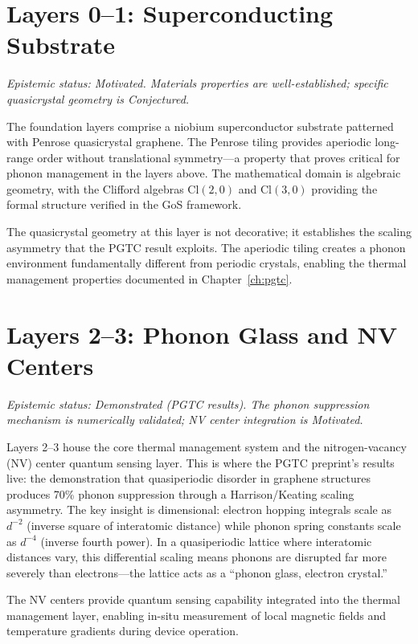 \documentclass[12pt,letterpaper]{report}
\newcommand{\epistemic}[1]{%
  \par\vspace{4pt}%
  {\small\itshape\color{gray} Epistemic status: #1}%
  \par\vspace{4pt}%
}
\begin{document}
\section{Layers 0--1: Superconducting Substrate}

\epistemic{Motivated. Materials properties are well-established; specific quasicrystal geometry is Conjectured.}

The foundation layers comprise a niobium superconductor substrate patterned with Penrose quasicrystal graphene. The Penrose tiling provides aperiodic long-range order without translational symmetry---a property that proves critical for phonon management in the layers above. The mathematical domain is algebraic geometry, with the Clifford algebras $\mathrm{Cl}(2,0)$ and $\mathrm{Cl}(3,0)$ providing the formal structure verified in the GoS framework.

The quasicrystal geometry at this layer is not decorative; it establishes the scaling asymmetry that the PGTC result exploits. The aperiodic tiling creates a phonon environment fundamentally different from periodic crystals, enabling the thermal management properties documented in Chapter~\ref{ch:pgtc}.

\section{Layers 2--3: Phonon Glass and NV Centers}

\epistemic{Demonstrated (PGTC results). The phonon suppression mechanism is numerically validated; NV center integration is Motivated.}

Layers 2--3 house the core thermal management system and the nitrogen-vacancy (NV) center quantum sensing layer. This is where the PGTC preprint's results live: the demonstration that quasiperiodic disorder in graphene structures produces 70\% phonon suppression through a Harrison/Keating scaling asymmetry. The key insight is dimensional: electron hopping integrals scale as $d^{-2}$ (inverse square of interatomic distance) while phonon spring constants scale as $d^{-4}$ (inverse fourth power). In a quasiperiodic lattice where interatomic distances vary, this differential scaling means phonons are disrupted far more severely than electrons---the lattice acts as a ``phonon glass, electron crystal.''

The NV centers provide quantum sensing capability integrated into the thermal management layer, enabling in-situ measurement of local magnetic fields and temperature gradients during device operation.
\end{document}
